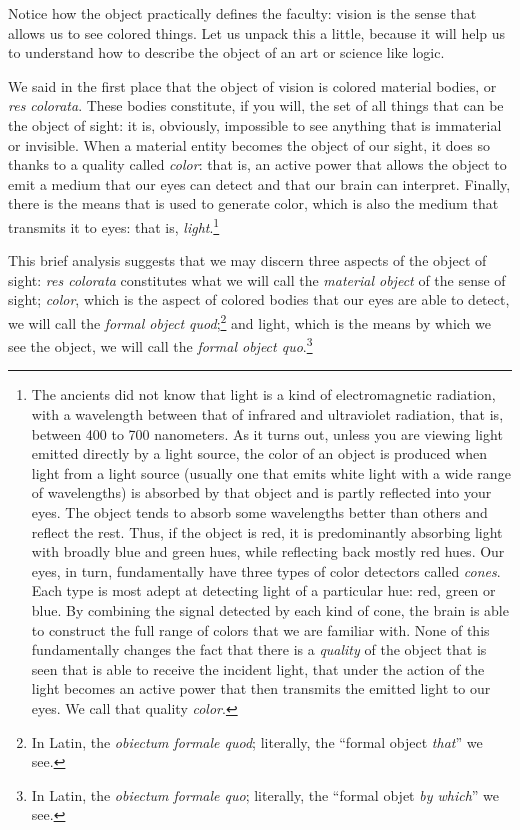 \documentclass[
  12pt,
]{memoir}
\begin{document}
\noindent Notice how the object practically defines the faculty: vision
is the sense that allows us to see colored things. Let us unpack this a
little, because it will help us to understand how to describe the object
of an art or science like logic.

We said in the first place that the object of vision is colored material
bodies, or \emph{res colorata}. These bodies constitute, if you will,
the set of all things that can be the object of sight: it is, obviously,
impossible to see anything that is immaterial or invisible. When a
material entity becomes the object of our sight, it does so thanks to a
quality called \emph{color}: that is, an active power that allows the
object to emit a medium that our eyes can detect and that our brain can
interpret. Finally, there is the means that is used to generate color,
which is also the medium that transmits it to eyes: that is,
\emph{light}.\footnote{The ancients did not know that light is a kind of
  electromagnetic radiation, with a wavelength between that of infrared
  and ultraviolet radiation, that is, between 400 to 700 nanometers. As
  it turns out, unless you are viewing light emitted directly by a light
  source, the color of an object is produced when light from a light
  source (usually one that emits white light with a wide range of
  wavelengths) is absorbed by that object and is partly reflected into
  your eyes. The object tends to absorb some wavelengths better than
  others and reflect the rest. Thus, if the object is red, it is
  predominantly absorbing light with broadly blue and green hues, while
  reflecting back mostly red hues. Our eyes, in turn, fundamentally have
  three types of color detectors called \emph{cones}. Each type is most
  adept at detecting light of a particular hue: red, green or blue. By
  combining the signal detected by each kind of cone, the brain is able
  to construct the full range of colors that we are familiar with. None
  of this fundamentally changes the fact that there is a \emph{quality}
  of the object that is seen that is able to receive the incident light,
  that under the action of the light becomes an active power that then
  transmits the emitted light to our eyes. We call that quality
  \emph{color}.}

This brief analysis suggests that we may discern three aspects of the
object of sight: \emph{res colorata} constitutes what we will call the
\emph{material object} of the sense of sight; \emph{color}, which is the
aspect of colored bodies that our eyes are able to detect, we will call
the \emph{formal object quod};\footnote{In Latin, the \emph{obiectum
  formale quod}; literally, the ``formal object \emph{that}'' we see.}
and light, which is the means by which we see the object, we will call
the \emph{formal object quo}.\footnote{In Latin, the \emph{obiectum
  formale quo}; literally, the ``formal objet \emph{by which}'' we see.}
\end{document}
